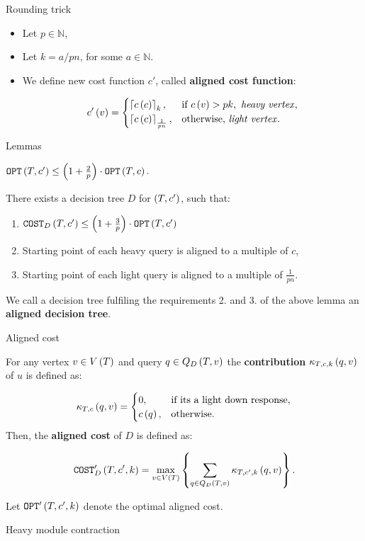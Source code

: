 \begin{frame}{Rounding trick}
    \begin{itemize}
        \item Let $p \in \mathbb{N}$,
        \item Let $k=a/pn$, for some $a\in \mathbb{N}$.
        \pause
        \item We define new cost function $c'$, called \textbf{aligned cost function}:

    $$
c'\left( v \right)=\begin{cases}
    \left\lceil c\left( c \right) \right\rceil_k, & \text{if } c\left( v \right)>pk, \text{ \textit{heavy vertex}},\\
    \left\lceil c\left( c \right) \right\rceil_{\frac{1}{pn}}, & \text{otherwise, \textit{light vertex}}.\\
\end{cases}
$$
    \end{itemize}
\end{frame}

\begin{frame}{Lemmas}
     
\begin{lemma}\label{rounded_dt_lemma}
    $
    \texttt{OPT}\left( T,c' \right)\leq \left( 1+\frac{2}{p} \right)\cdot \texttt{OPT}\left( T,c \right).
    $
\end{lemma}
\pause
\begin{lemma}\label{aligned_dts_lemma}
    There exists a decision tree $D$ for $\left( T,c' \right)$, such that:
    \begin{enumerate}
        \item $\texttt{COST}_{D}\left( T, c' \right)\leq \left( 1+\frac{3}{p} \right)\cdot\texttt{OPT}\left( T, c' \right)$
        \item Starting point of each heavy query is aligned to a multiple of $c$,
        \item Starting point of each light query is aligned to a multiple of $\frac{1}{pn}$.
    \end{enumerate}
\end{lemma}
\pause

We call a decision tree fulfiling the requirements 2. and 3. of the above lemma an \textbf{aligned decision tree}.
\end{frame}

\begin{frame}{Aligned cost}

    For any vertex $v\in V\left( T \right)$ and query $q\in Q_{D}\left( T,v \right)$ the \textbf{contribution} $\kappa_{T,c,k}\left( q,v \right)$ of $u$ is defined as:

    $$
\kappa_{T,c}\left( q, v \right)= \begin{cases}
    0, & \text{if its a light down response},\\
    c\left( q \right), & \text{otherwise}.
\end{cases}
$$
\pause
Then, the \textbf{aligned cost} of $D$ is defined as:

$$
\texttt{COST}'_D\left( T,c',k \right)=\max_{v\in V\left( T \right)}\left\{ \sum_{q\in Q_D\left( T,v \right)}\kappa_{T,c', k}\left( q,v \right) \right\}.
$$

Let $\texttt{OPT}'\left( T,c',k \right)$ denote the optimal aligned cost.
\end{frame}
\begin{frame}{Heavy module contraction}

\end{frame}

